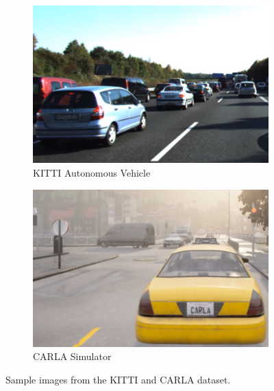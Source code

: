 
\begin{figure}[H]
    \centering
    \begin{subfigure}[b]{0.48\textwidth}
        \centering
        \includegraphics[width=\linewidth]{figures/chapter_tracking/kitti_demo.png}
        \caption{KITTI Autonomous Vehicle}
        \label{fig:tracking_demo_kitti} 
    \end{subfigure}
    \begin{subfigure}[b]{0.48\textwidth}
        \centering
        \includegraphics[width=\linewidth]{figures/chapter_tracking/carla_demo.png}
        \caption{CARLA Simulator}
        \label{fig:tracking_demo_carla}
    \end{subfigure}
  \caption{Sample images from the KITTI and CARLA dataset.}
  \label{fig:tracking_demo}
\end{figure}

